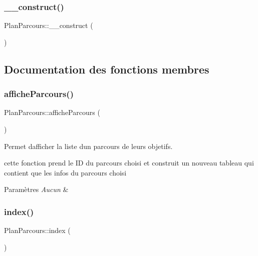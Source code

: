 \subsubsection{\texorpdfstring{\+\_\+\+\_\+construct()}{\_\_construct()}}
{\footnotesize\ttfamily Plan\+Parcours\+::\+\_\+\+\_\+construct (\begin{DoxyParamCaption}{ }\end{DoxyParamCaption})}



\subsection{Documentation des fonctions membres}
\mbox{\label{class_plan_parcours_aceb6c03fe7a721229c7f3fef3f2423a1}} 
\subsubsection{\texorpdfstring{affiche\+Parcours()}{afficheParcours()}}
{\footnotesize\ttfamily Plan\+Parcours\+::affiche\+Parcours (\begin{DoxyParamCaption}{ }\end{DoxyParamCaption})}



Permet d\textquotesingle{}afficher la liste d\textquotesingle{}un parcours de leurs objetifs. 

cette fonction prend le ID du parcours choisi et construit un nouveau tableau qui contient que les infos du parcours choisi 
\begin{DoxyParams}{Paramètres}
{\em Aucun} & \\
\hline
\end{DoxyParams}
\mbox{\label{class_plan_parcours_a8c0cd2eecf9fa1bc5b260052d63a686f}} 
\subsubsection{\texorpdfstring{index()}{index()}}
{\footnotesize\ttfamily Plan\+Parcours\+::index (\begin{DoxyParamCaption}{ }\end{DoxyParamCaption})}



